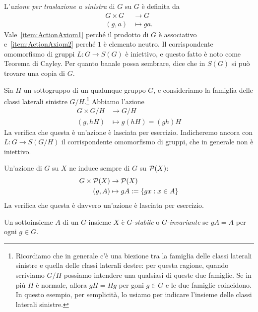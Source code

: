 \begin{esem}\label{esem:AzioneTraslazione}
L'{\em azione per traslazione a sinistra} di $G$ su $G$ è definita da
\[\begin{aligned}
G \times G &\to G \\ 
(g,a) &\mapsto ga .
\end{aligned}\]
Vale~\ref{item:ActionAxiom1} perché il prodotto di $G$ è associativo e~\ref{item:ActionAxiom2} perché $1$ è elemento neutro. Il corrispondente omomorfismo di gruppi $L : G\to S(G)$ è iniettivo, e questo fatto è noto come {\sc Teorema di Cayley}. Per quanto banale possa sembrare, dice che in $S(G)$ si può trovare una copia di $G$.
\end{esem}

\begin{esem}\label{esem:AzioneTraslazioneClassiLaterali}
Sia $H$ un sottogruppo di un qualunque gruppo $G$, e consideriamo la famiglia delle classi laterali sinistre $G/H$.\footnote{Ricordiamo che in generale c'è una biezione tra la famiglia delle classi laterali sinistre e quella delle classi laterali destre: per questa ragione, quando scriviamo $G/H$ possiamo intendere una qualsiasi di queste due famiglie. Se in più $H$ è normale, allora $gH=Hg$ per goni $g \in G$ e le due famiglie coincidono. In questo esempio, per semplicità, lo usiamo per indicare l'insieme delle classi laterali sinistre.} Abbiamo l'azione
\[\begin{aligned}
G \times G/H &\to G/H \\ 
(g,hH) &\mapsto g(hH) = (gh)H
\end{aligned}\]
La verifica che questa è un'azione è lasciata per esercizio. Indicheremo ancora con $L : G \to S(G/H)$ il corrispondente omomorfismo di gruppi, che in generale non è iniettivo.
\end{esem}

\begin{esem}\label{esem:AzioneIndottaSulleParti}
Un'azione di $G$ su $X$ ne induce sempre di $G$ su $\mathcal{P}(X)$:
\[\begin{aligned}
G \times \mathcal{P}(X) &\to \mathcal{P}(X) \\
(g,A) &\mapsto gA:=\{gx : x \in A\}
\end{aligned}\]
La verifica che questa è davvero un'azione è lasciata per esercizio.
\end{esem}

\begin{defi}
Un sottoinsieme $A$ di un $G$-insieme $X$ è $G$-{\em stabile} o $G$-{\em invariante} se $gA=A$ per ogni $g \in G$.
\end{defi}

